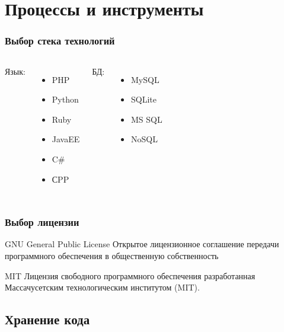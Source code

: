 \documentclass{beamer}
\begin{document}
\section{Процессы и инструменты}

\begin{frame}
\frametitle{Выбор стека технологий}

\begin{columns}[t]
Язык:
\begin{itemize}
\item PHP
\item Python
\item Ruby
\item JavaEE
\item C\#
\item СPP
\end{itemize}

БД:
\begin{itemize}
\item MySQL
\item SQLite
\item MS SQL
\item NoSQL
\end{itemize}
\end{columns}

\end{frame}


\begin{frame}
\frametitle{Выбор лицензии}

\begin{block}{GNU General Public License}
Открытое лицензионное соглашение передачи программного обеспечения в общественную собственность
\end{block}
\bigskip
\begin{block}{MIT}
Лицензия свободного программного обеспечения разработанная Массачусетским технологическим институтом (MIT).
\end{block}

\end{frame}


\subsection{Хранение кода}
\end{document}
